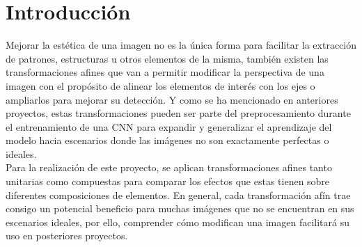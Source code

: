 \section{Introducción}
    Mejorar la estética de una imagen no es la única forma para facilitar la extracción 
    de patrones, estructuras u otros elementos de la misma, también existen las 
    transformaciones afines que van a permitir modificar la perspectiva  
    de una imagen con el propósito de alinear los elementos de interés con los 
    ejes o ampliarlos para mejorar su detección. Y como se ha mencionado en 
    anteriores proyectos, estas transformaciones pueden ser parte del 
    preprocesamiento durante el entrenamiento de una CNN para expandir y generalizar 
    el aprendizaje del modelo hacia escenarios donde las imágenes no son exactamente 
    perfectas o ideales.\\

    Para la realización de este proyecto, se aplican transformaciones afines tanto unitarias 
    como compuestas para comparar los efectos que estas tienen sobre diferentes composiciones 
    de elementos. En general, cada transformación afín trae consigo un potencial beneficio 
    para muchas imágenes que no se encuentran en sus escenarios ideales, por ello, comprender 
    cómo modifican una imagen facilitará su uso en posteriores proyectos.